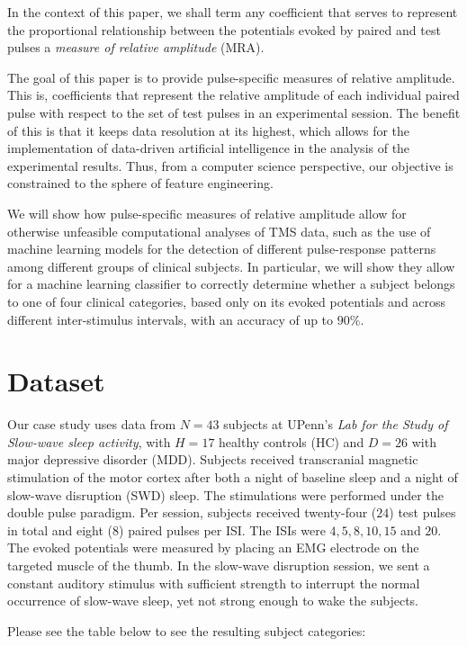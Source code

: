 \documentclass{article}
\begin{document}
\begin{multicols}{2}
In the context of this paper, we shall term any coefficient that serves to
represent the proportional relationship between the potentials evoked by paired
and test pulses a \textit{measure of relative amplitude} (MRA).

The goal of this paper is to provide pulse-specific measures of relative
amplitude. This is, coefficients that represent the relative amplitude of each
individual paired pulse with respect to the set of test pulses in an
experimental session. The benefit of this is that it keeps data resolution at
its highest, which allows for the implementation of data-driven artificial
intelligence in the analysis of the experimental results. Thus, from a computer
science perspective, our objective is constrained to the sphere of feature
engineering. 

We will show how pulse-specific measures of relative amplitude allow for
otherwise unfeasible computational analyses of TMS data, such as the use of
machine learning models for the detection of different pulse-response patterns
among different groups of clinical subjects. In particular, we will show they
allow for a machine learning classifier to correctly determine whether a
subject belongs to one of four clinical categories, based only on its evoked
potentials and across different inter-stimulus intervals, with an accuracy of up to
$90\%$.

\section{Dataset}

Our case study uses data from $N = 43$ subjects at UPenn's \textit{Lab for the
Study of Slow-wave sleep activity}, with $H = 17$ healthy controls (HC) and $D =
26$ with major depressive disorder (MDD). Subjects received transcranial
magnetic stimulation of the motor cortex after both a night of baseline sleep
and a night of slow-wave disruption (SWD) sleep. The stimulations were performed
under the double pulse paradigm. Per session, subjects received twenty-four
($24$) test pulses in total and eight ($8$) paired pulses per ISI. The ISIs were
$4, 5, 8, 10, 15$ and $20$. The evoked potentials were measured by placing an
EMG electrode on the targeted muscle of the thumb. In the slow-wave disruption
session, we sent a constant auditory stimulus with sufficient strength to
interrupt the normal occurrence of slow-wave sleep, yet not strong enough to
wake the subjects.

Please see the table below to see the resulting subject categories:


\end{multicols}
\end{document}
